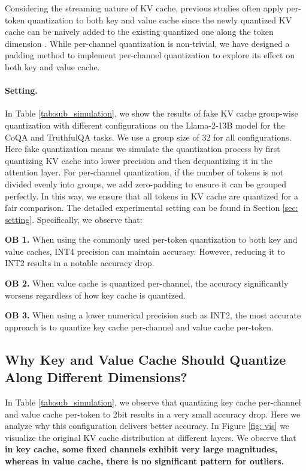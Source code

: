 Considering the streaming nature of KV cache, previous studies often apply per-token quantization to both key and value cache since the newly quantized KV cache can be naively added to the existing quantized one along the token dimension \citep{flexgen}. While per-channel quantization is non-trivial, we have designed a padding method to implement per-channel quantization to explore its effect on both key and value cache.

\paragraph{Setting.}
In Table \ref{tab:sub_simulation}, we show the results of fake KV cache group-wise quantization with different configurations on the Llama-2-13B model for the CoQA and TruthfulQA tasks. We use a group size of 32 for all configurations.
Here fake quantization means we simulate the quantization process by first quantizing KV cache into lower precision and then dequantizing it in the attention layer.
For per-channel quantization, if the number of tokens is not divided evenly into groups, we add zero-padding to ensure it can be grouped perfectly.
In this way, we ensure that all tokens in KV cache are quantized for a fair comparison.
The detailed experimental setting can be found in Section \ref{sec: setting}.
Specifically, we observe that: 

\noindent
\textbf{OB 1.} When using the commonly used per-token quantization to both key and value caches, INT4 precision can maintain accuracy. However, reducing it to INT2 results in a notable accuracy drop.

\noindent
\textbf{OB 2.} When value cache is quantized per-channel, the accuracy significantly worsens regardless of how key cache is quantized.

\noindent
\textbf{OB 3.}  When using a lower numerical precision such as INT2, the most accurate approach is to quantize key cache per-channel and value cache per-token.



\subsection{Why Key and Value Cache Should Quantize Along Different Dimensions?}
\label{sec: analysis}
In Table \ref{tab:sub_simulation}, we observe that quantizing key cache per-channel and value cache per-token to 2bit results in a very small accuracy drop.
Here we analyze why this configuration delivers better accuracy.
In Figure \ref{fig: vis} we visualize the original KV cache distribution at different layers.
We observe that \textbf{in key cache, some fixed channels exhibit very large magnitudes, whereas in value cache, there is no significant pattern for outliers.}

